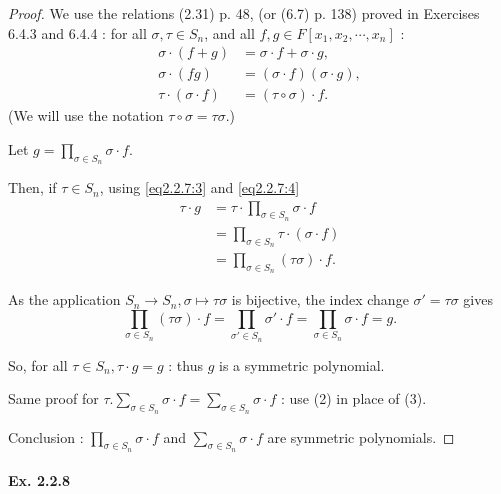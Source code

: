 \documentclass[11pt,a4paper]{article}
\begin{document}
\begin{proof}
We use the relations (2.31) p. 48, (or (6.7) p. 138) proved in Exercises 6.4.3 and 6.4.4 :  for all $\sigma,\tau \in S_n$, and all $f,g \in F[x_1,x_2,\cdots,x_n]$ : 
\begin{align}
\sigma \cdot (f+g) &= \sigma \cdot f + \sigma \cdot g, \label{eq2.2.7:2}\\
\sigma \cdot (fg) &= (\sigma \cdot f)(\sigma \cdot g),\label{eq2.2.7:3}\\
\tau\cdot (\sigma \cdot f) &= (\tau \circ \sigma) \cdot f.\label{eq2.2.7:4}
\end{align}
(We will use the notation $\tau \circ \sigma = \tau  \sigma$.)

Let $g = \prod_{\sigma \in S_n} \sigma \cdot f$.

Then, if $\tau \in S_n$, using \eqref{eq2.2.7:3} and \eqref{eq2.2.7:4}
\begin{align*}
\tau \cdot g &= \tau \cdot \prod_{\sigma \in S_n} \sigma \cdot f\\
&=\prod_{\sigma \in S_n}  \tau \cdot (\sigma \cdot f)\\
&=\prod_{\sigma \in S_n} (\tau \sigma) \cdot f.
\end{align*}

As the application $S_n \to S_n, \sigma \mapsto \tau \sigma$ is bijective, the index change $\sigma' = \tau \sigma$ gives 
$$\prod_{\sigma \in S_n} (\tau \sigma) \cdot f = \prod_{\sigma' \in S_n} \sigma' \cdot f = \prod_{\sigma \in S_n} \sigma \cdot f= g.$$

So,  for all $\tau \in S_n, \tau \cdot g = g$ : thus $g$ is a symmetric polynomial.

Same proof for $\tau. \sum _{\sigma \in S_n} \sigma \cdot f = \sum _{\sigma \in S_n} \sigma \cdot f $ : use (2) in place of (3).

Conclusion : $\prod\limits_{\sigma \in S_n} \sigma \cdot f$ and $\sum\limits_{\sigma \in S_n} \sigma \cdot f$ are symmetric polynomials.
\end{proof}

\paragraph{Ex. 2.2.8}
\end{document}
